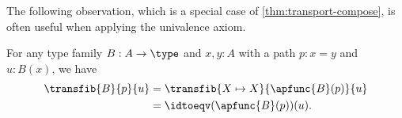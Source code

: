 The following observation, which is a special case of \cref{thm:transport-compose}, is often useful when applying the univalence axiom.

\begin{lem}\label{thm:transport-is-ap}
  For any type family $B:A\to\type$ and $x,y:A$ with a path $p:x=y$ and $u:B(x)$, we have
  \begin{align*}
    \transfib{B}{p}{u} &= \transfib{X\mapsto X}{\apfunc{B}(p)}{u}\\
    &= \idtoeqv(\apfunc{B}(p))(u).
  \end{align*}
\end{lem}

%
%

